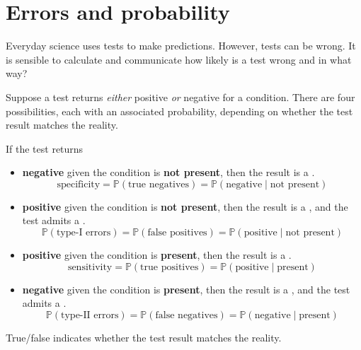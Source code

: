 \documentclass[../main.tex]{subfiles}
\begin{document}
 \section{Errors and probability}

Everyday science uses tests to make predictions. However, tests can be wrong. It is sensible to calculate and communicate how likely is a test wrong and in what way?

\begin{definition}\label{def:errors}
  Suppose a test returns \emph{either} positive \emph{or} negative for a condition. There are four possibilities, each with an associated probability, depending on whether the test result matches the reality.  

  If the test returns
  \begin{itemize}
    \item \textbf{negative} given the condition is \textbf{not present}, then the result is a .
      \[
      \text{specificity} = \mathbb{P}(\text{true negatives}) = 
      \mathbb{P}(\text{negative} \mid \text{not present})
      \]
    \item \textbf{positive} given the condition is \textbf{not present}, then the result is a , and the test admits a .
      \[
      \mathbb{P}(\text{type-I errors}) = \mathbb{P}(\text{false positives}) = 
      \mathbb{P}(\text{positive} \mid \text{not present})
      \]
    \item \textbf{positive} given the condition is \textbf{present}, then the result is a .
      \[
      \text{sensitivity} = \mathbb{P}(\text{true positives}) = 
      \mathbb{P}(\text{positive} \mid \text{present})
      \]
    \item \textbf{negative} given the condition is \textbf{present}, then the result is a , and the test admits a .
      \[
      \mathbb{P}(\text{type-II errors}) = \mathbb{P}(\text{false negatives}) = 
      \mathbb{P}(\text{negative} \mid \text{present})
      \]
  \end{itemize}

  \faStar{} True/false indicates whether the test result matches the reality.
\end{definition}

\blanks*
\clearpage
\end{document}
